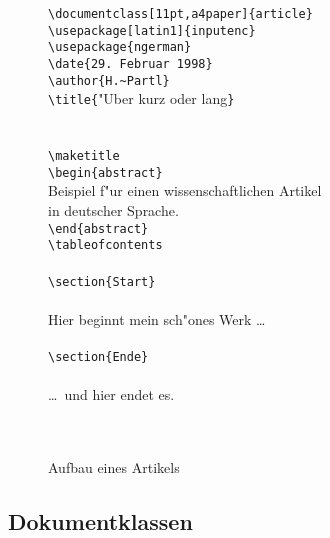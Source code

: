\begin{figure}[hbtp] %
\oben{10cm}
\begin{flushleft}\ttfamily
\verb+\documentclass[11pt,a4paper]{article}+\\
\verb+\usepackage[latin1]{inputenc}+\\
\verb+\usepackage{ngerman}+\\
\verb+\date{29. Februar 1998}+\\
\verb+\author{H.~Partl}+\\
\verb+\title{+"Uber kurz oder lang\verb+}+\\
\ \\
\verb++\\
\verb+\maketitle+\\
\verb+\begin{abstract}+\\
Beispiel f"ur einen wissenschaftlichen Artikel\\
in deutscher Sprache.\\
\verb+\end{abstract}+\\
\verb+\tableofcontents+\\
\ \\
\verb+\section{Start}+\\
\ \\
Hier beginnt mein sch"ones Werk \dots\\
\ \\
\verb+\section{Ende}+\\
\ \\
\dots\ und hier endet es.\\
\ \\
\verb++\\[1\baselineskip]
\end{flushleft}
\unten
\caption{Aufbau eines Artikels} \label{dokument}
\end{figure}
 
 
\subsection{Dokumentklassen}\label{docsty}
 
